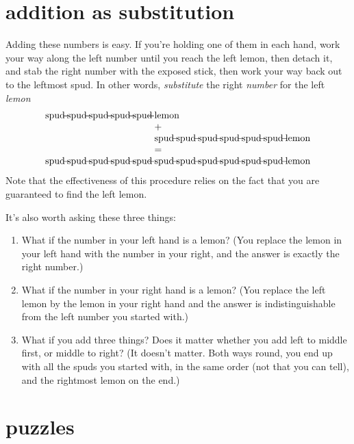 \documentclass{book}
\begin{document}
\section{addition as substitution}

Adding these numbers is easy. If you're holding one of them in each hand, work your way along the left number until you reach the left lemon, then detach it, and stab the right number with the exposed stick, then work your way back out to the leftmost spud. In other words, \emph{substitute} the right \emph{number} for the left \emph{lemon}
\[\begin{array}{l@{\;\,}l}
\spud\spud\spud\spud\spud&\lemon\\
&+ \\
&\spud\spud\spud\spud\spud\spud\lemon\\
&= \\
\spud\spud\spud\spud\spud&\spud\spud\spud\spud\spud\spud\lemon\\
\end{array}
\]
Note that the effectiveness of this procedure relies on the fact that you are guaranteed to find the left lemon.

It's also worth asking these three things:
\begin{enumerate}
\item What if the number in your left hand is a lemon? (You replace the lemon in your left hand with the number in your right, and the answer is exactly the right number.)
\item What if the number in your right hand is a lemon? (You replace the left lemon by the lemon in your right hand and the answer is indistinguishable from the left number you started with.)
\item What if you add three things? Does it matter whether you add left to middle first, or middle to right? (It doesn't matter. Both ways round, you end up with all the spuds you started with, in the same order (not that you can tell), and the rightmost lemon on the end.)
\end{enumerate}


\section{puzzles}
\end{document}
